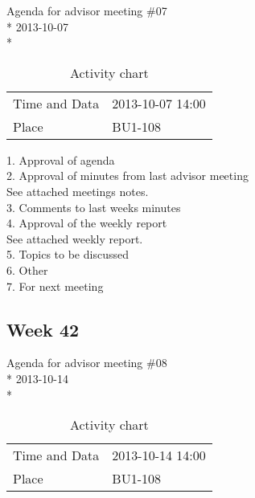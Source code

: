 \begin{center}
Agenda for advisor meeting \#07\\*
2013-10-07\\*
\end{center}

\begin{table}[H]
\begin{center}
\begin{tabular}{ l | l }
Time and Data & 2013-10-07 14:00 \\
Place & BU1-108 \\
\end{tabular}
\end{center}
\caption{Activity chart}
\label{table:activityChartAdvisorAgendaWeek41}
\end{table}


1. Approval of agenda \\
2. Approval of minutes from last advisor meeting \\
See attached meetings notes. \\
3. Comments to last weeks minutes \\
4. Approval of the weekly report \\
See attached weekly report. \\
5. Topics to be discussed \\
6. Other \\
7. For next meeting \\

\newpage
\subsection{Week 42}

\begin{center}
Agenda for advisor meeting \#08\\*
2013-10-14\\*
\end{center}

\begin{table}[H]
\begin{center}
\begin{tabular}{ l | l }
Time and Data & 2013-10-14 14:00 \\
Place & BU1-108 \\
\end{tabular}
\end{center}
\caption{Activity chart}
\label{table:activityChartAdvisorAgendaWeek42}
\end{table}


